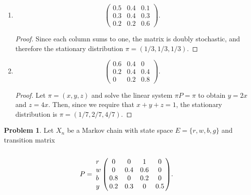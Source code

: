 \documentclass[oneside,reqno]{amsart}
\theoremstyle{definition}
\newtheorem{prob}{Problem}
\begin{document}
\begin{enumerate}
\item
\[
	\begin{pmatrix}
		0.5 & 0.4 & 0.1 \\
		0.3 & 0.4 & 0.3 \\
		0.2 & 0.2 & 0.6
	\end{pmatrix}.
\]
\begin{proof}
Since each column sums to one, the matrix is doubly stochastic, and therefore the stationary distribution $\pi = (1/3, 1/3, 1/3)$.
\end{proof}
\item
\[
	\begin{pmatrix}
		0.6 & 0.4 & 0 \\
		0.2 & 0.4 & 0.4 \\
		0 & 0.2 & 0.8
	\end{pmatrix}.
\]
\begin{proof}
Let $\pi = (x,y,z)$ and solve the linear system $\pi P = \pi$ to obtain $y = 2x$ and $z = 4x$. Then, since we require that $x + y + z =1$, the stationary distribution is $\pi = (1/7, 2/7, 4/7)$.
\end{proof}
\end{enumerate}


\begin{prob}
Let $X_n$ be a Markov chain with state space $E = \{r, w, b, g\}$ and transition matrix 
\[
	P = \bordermatrix{~ \cr
		r & 0 & 0 & 1 & 0 \cr
		w & 0 & 0.4 & 0.6 & 0 \cr
		b & 0.8 & 0 & 0.2 & 0 \cr
		y & 0.2 & 0.3 & 0 & 0.5 \cr}.
\]
\end{prob}
\end{document}
